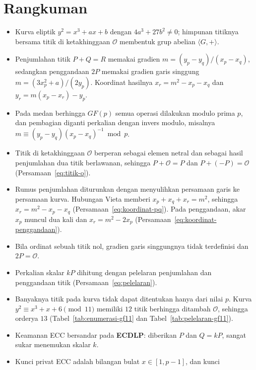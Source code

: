 \section{Rangkuman}
\begin{itemize}
    \item Kurva eliptik $y^2 = x^3 + ax + b$ dengan $4a^3 + 27b^2 \neq 0$;
          himpunan titiknya bersama titik di ketakhinggaan $\mathcal{O}$
          membentuk grup abelian $\langle G, + \rangle$.
    \item Penjumlahan titik $P + Q = R$ memakai gradien
          $m = (y_p - y_q)/(x_p - x_q)$, sedangkan penggandaan $2P$ memakai
          gradien garis singgung $m = (3x_p^2 + a)/(2y_p)$. Koordinat hasilnya
          $x_r = m^2 - x_p - x_q$ dan $y_r = m(x_p - x_r) - y_p$.
    \item Pada medan berhingga $GF(p)$ semua operasi dilakukan modulo prima
          $p$, dan pembagian diganti perkalian dengan invers modulo, misalnya
          $m \equiv (y_p - y_q)(x_p - x_q)^{-1} \bmod p$.
    \item Titik di ketakhinggaan $\mathcal{O}$ berperan sebagai elemen netral
          dan sebagai hasil penjumlahan dua titik berlawanan, sehingga
          $P + \mathcal{O} = P$ dan $P + (-P) = \mathcal{O}$
          (Persamaan~\eqref{eq:titik-o}).
    \item Rumus penjumlahan diturunkan dengan menyulihkan persamaan garis ke
          persamaan kurva. Hubungan Vieta memberi $x_p + x_q + x_r = m^2$,
          sehingga $x_r = m^2 - x_p - x_q$
          (Persamaan~\eqref{eq:koordinat-pq}). Pada penggandaan, akar $x_p$
          muncul dua kali dan $x_r = m^2 - 2x_p$
          (Persamaan~\eqref{eq:koordinat-penggandaan}).
    \item Bila ordinat sebuah titik nol, gradien garis singgungnya tidak
          terdefinisi dan $2P = \mathcal{O}$.
    \item Perkalian skalar $kP$ dihitung dengan pelelaran penjumlahan dan
          penggandaan titik (Persamaan~\eqref{eq:pelelaran}).
    \item Banyaknya titik pada kurva tidak dapat ditentukan hanya dari nilai
          $p$. Kurva $y^2 \equiv x^3 + x + 6 \pmod{11}$ memiliki $12$ titik
          berhingga ditambah $\mathcal{O}$, sehingga orderya $13$
          (Tabel~\ref{tab:enumerasi-gf11} dan Tabel~\ref{tab:pelelaran-gf11}).
    \item Keamanan ECC bersandar pada \textbf{ECDLP}: diberikan $P$ dan
          $Q = kP$, sangat sukar menemukan skalar $k$.
    \item Kunci privat ECC adalah bilangan bulat $x \in [1, p-1]$, dan kunci

\end{itemize}

